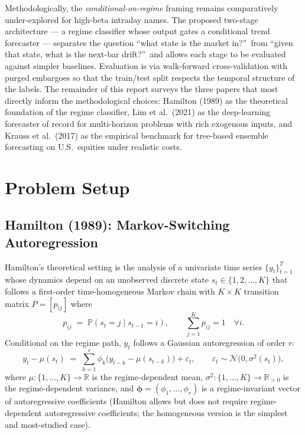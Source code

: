 \documentclass[11pt]{article}
\begin{document}
Methodologically, the \emph{conditional-on-regime} framing remains comparatively under-explored for high-beta intraday names.  The proposed two-stage architecture --- a regime classifier whose output gates a conditional trend forecaster --- separates the question ``what state is the market in?''\ from ``given that state, what is the next-bar drift?''\ and allows each stage to be evaluated against simpler baselines.  Evaluation is via walk-forward cross-validation with purged embargoes \cite{lopezdeprado2018} so that the train/test split respects the temporal structure of the labels.  The remainder of this report surveys the three papers that most directly inform the methodological choices: Hamilton (1989) as the theoretical foundation of the regime classifier, Lim et al.\ (2021) as the deep-learning forecaster of record for multi-horizon problems with rich exogenous inputs, and Krauss et al.\ (2017) as the empirical benchmark for tree-based ensemble forecasting on U.S.\ equities under realistic costs.

\section{Problem Setup}

\subsection{Hamilton (1989): Markov-Switching Autoregression}

Hamilton's theoretical setting is the analysis of a univariate time series $\{y_t\}_{t=1}^{T}$ whose dynamics depend on an unobserved discrete state $s_t \in \{1,2,\dots,K\}$ that follows a first-order time-homogeneous Markov chain with $K \times K$ transition matrix $P = [p_{ij}]$ where
\begin{equation}
    p_{ij} \;=\; \mathbb{P}(s_t = j \mid s_{t-1} = i), \qquad \sum_{j=1}^{K} p_{ij} = 1 \quad \forall i.
\end{equation}
Conditional on the regime path, $y_t$ follows a Gaussian autoregression of order $r$:
\begin{equation}
    y_t - \mu(s_t) \;=\; \sum_{k=1}^{r} \phi_k \bigl( y_{t-k} - \mu(s_{t-k}) \bigr) + \varepsilon_t, \qquad \varepsilon_t \sim \mathcal{N}\bigl(0,\sigma^2(s_t)\bigr),
\label{eq:msar}
\end{equation}
where $\mu : \{1,\dots,K\} \to \mathbb{R}$ is the regime-dependent mean, $\sigma^2 : \{1,\dots,K\} \to \mathbb{R}_{>0}$ is the regime-dependent variance, and $\bm{\phi} = (\phi_1,\dots,\phi_r)$ is a regime-invariant vector of autoregressive coefficients (Hamilton allows but does not require regime-dependent autoregressive coefficients; the homogeneous version is the simplest and most-studied case).
\end{document}
